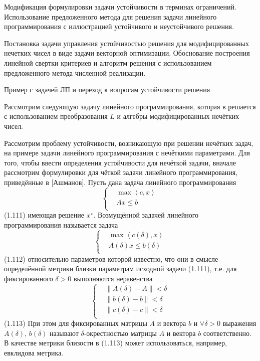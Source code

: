 Модификация формулировки задачи устойчивости в терминах ограничений. Использование предложенного метода для решения задачи линейного программирования с иллюстрацией устойчивого и неустойчивого решения. 

Постановка задачи управления устойчивостью решения для модифицированных нечетких чисел в виде задачи векторной оптимизации. Обоснование построения линейной свертки критериев и алгоритм решения с использованием предложенного метода численной реализации.

Пример с задачей ЛП и переход к вопросам устойчивости решения

Рассмотрим следующую задачу линейного программирования, которая в \cite{Vorontsov_PI} решается с использованием преобразования $L$ и алгебры модифицированных нечётких чисел.

Рассмотрим проблему устойчивости, возникающую при решении нечётких задач, на примере задачи линейного программирования с нечёткими параметрами. Для того, чтобы ввести определения устойчивости для нечёткой задачи, вначале рассмотрим формулировки для чёткой задачи линейного программирования, приведённые в [Ашманов].
Пусть дана задача линейного программирования
	\[\left\{ \begin{aligned}
  & \max \left\langle c,x \right\rangle  \\ 
 & Ax\le b \\ 
\end{aligned} \right.\] 	(1.111)
имеющая решение ${{x}^{\star}}$. Возмущённой задачей линейного программирования называется задача
	\[\left\{ \begin{aligned}
  & \max \left\langle c\left( \delta  \right),x \right\rangle  \\ 
 & A\left( \delta  \right)x\le b\left( \delta  \right) \\ 
\end{aligned} \right.\] 	(1.112)
относительно параметров которой известно, что они в смысле определённой метрики близки параметрам исходной задачи (1.111), т.е. для фиксированного $\delta >0$ выполняются неравенства
	\[\left\{ \begin{aligned}
  & \left\| A\left( \delta  \right)-A \right\|<\delta  \\ 
 & \left\| b\left( \delta  \right)-b \right\|<\delta  \\ 
 & \left\| c\left( \delta  \right)-c \right\|<\delta  \\ 
\end{aligned} \right.\] 	(1.113)
При этом для фиксированных матрицы $A$ и вектора $b$ и $\forall \delta >\text{0}$ выражения $A\left( \delta  \right)$, $b\left( \delta  \right)$ называют $\delta$-окрестностью матрицы $A$ и вектора $b$ соответственно. В качестве метрики близости в (1.113) может использоваться, например, евклидова метрика.
